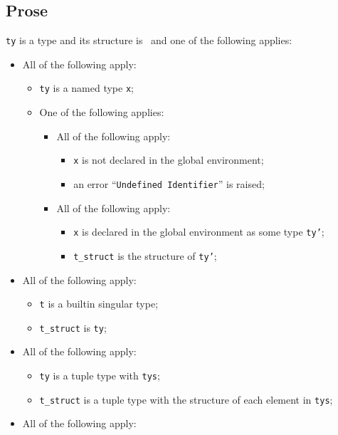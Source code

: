 \documentclass{book}
\begin{document}
    \subsection{Prose}
    \texttt{ty} is a type and its structure is \tstruct\ and one of the following
    applies:
    \begin{itemize}
    \item All of the following apply:
      \begin{itemize}
      \item \texttt{ty} is a named type \texttt{x};
      \item One of the following applies:
        \begin{itemize}
        \item All of the following apply:
          \begin{itemize}
          \item \texttt{x} is not declared in the global environment;
          \item an error ``\texttt{Undefined Identifier}'' is raised;
          \end{itemize}
        \item All of the following apply:
          \begin{itemize}
          \item \texttt{x} is declared in the global environment as some type \texttt{ty'};
          \item \texttt{t\_struct} is the structure of \texttt{ty'};
          \end{itemize}
       \end{itemize}
      \end{itemize}
    \item All of the following apply:
      \begin{itemize}
      \item \texttt{t} is a builtin singular type;
      \item \texttt{t\_struct} is \texttt{ty};
      \end{itemize}
    \item All of the following apply:
      \begin{itemize}
      \item \texttt{ty} is a tuple type with \texttt{tys};
      \item \texttt{t\_struct} is a tuple type with the structure of each element in \texttt{tys};
      \end{itemize}
    \item All of the following apply:

\end{itemize}
\end{document}
